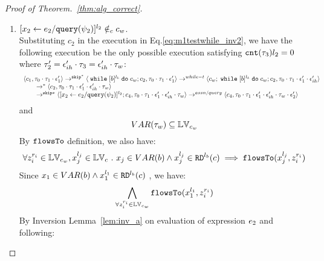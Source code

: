 \begin{proof}[Proof of Theorem.~\ref{thm:alg_correct}]
\begin{case}
\begin{subcase}
\begin{subsubcase}
\begin{subsubsubcase}
\begin{subproof}
\begin{enumerate}
  \\
  By uniqueness of the program label, there must exist another while command in $c_2$, -- i.e., $\ewhile [b_2]^{l_{b2}} \edo c_{w2} \in_c c_2$ --
    such that 
  $\ewhile [b]^{l_b} \edo c_w \in c_{w2}$ and $[\assign{{x}_2}{\expr_2 / \query(\qexpr_2)}]^{l_2} \in_c c_w$, i.e.,:
  \[
  \exists b_2, l_{b2} \in \mathbb{N}, c_{w2} \st 
  \ewhile [b_2]^{l_{b2}} \edo c_{w2} \in_c c_2 
  \land \ewhile [b]^{l_b} \edo c_w \in c_{w2}
  \land [\assign{{x}_2}{\expr_2 / \query(\qexpr_2)}]^{l_2} \in_c c_w
  \]
%
Then we know there exists $c_5$ and $c_6$ such that:
\[
  c_2 =_c c_5; \ewhile [b_2]^{l_{b2}} \edo c_{w2};c_6
\]
Which is contradict to $c_2 =_c [\eskip^*];[\assign{{x}_2}{\expr_2 / \query(\qexpr_2)}]^{l_2};{c}_4$ by program equality definition.
%
%
 \item $[\mathrel{ {x}_2 \leftarrow e_2 / {\tt query}(\psi_2) }]^{l_2} \notin_c c_w$.
%
\\
%
Substituting $c_2$ in the execution in Eq.\ref{eq:m1testwhile_inv2}, we have the following execution be the only possible execution satisfying $\mathtt{cnt}(\mathtt{\tau}_3) l_2 = 0$ where $\mathtt{\tau}_2' = \mathtt{\epsilon}_{ih}' \cdot \mathtt{\tau}_3 = \mathtt{\epsilon}_{ih}' \cdot \mathtt{\tau}_w$:
\[
    \begin{array}{l}   
  \langle c_1, \mathtt{\tau}_0 \cdot \mathtt{\tau}_1 \cdot \mathtt{\epsilon}_1' \rangle 
  \rightarrow^{\mathtt{skip}^*} 
  \langle \;\mathtt{while}\; [b]^{l_b} \;\mathtt{do}\; c_w;{c}_2, \mathtt{\tau}_0 \cdot \mathtt{\tau}_1 \cdot \mathtt{\epsilon}_1' \rangle 
  \rightarrow^{while-t} 
  \langle c_w;\;\mathtt{while}\; [b]^{l_b} \;\mathtt{do}\; c_w;c_2, \mathtt{\tau}_0 \cdot \mathtt{\tau}_1 \cdot \mathtt{\epsilon}_1' \cdot \mathtt{\epsilon}_{ih}' \rangle 
  \\
  \qquad \rightarrow^{*} 
  \langle c_2,\mathtt{\tau}_0 \cdot \mathtt{\tau}_1 \cdot \mathtt{\epsilon}_1' \cdot \mathtt{\epsilon}_{ih}' \cdot \mathtt{\tau}_w \rangle
  \\
  \qquad \rightarrow^{\mathtt{skip}*} 
  \langle [\mathrel{ {x}_2 \leftarrow e_2 / {\tt query}(\psi_2) }]^{l_2};{c}_4, 
  \mathtt{\tau}_0 \cdot \mathtt{\tau}_1 \cdot \mathtt{\epsilon}_1' \cdot \mathtt{\epsilon}_{ih}' \cdot \mathtt{\tau}_w \rangle
  \rightarrow^{assn/query} 
  \langle {c}_4,  \mathtt{\tau}_0 \cdot \mathtt{\tau}_1 \cdot \mathtt{\epsilon}_1' \cdot \mathtt{\epsilon}_{ih}' \cdot \mathtt{\tau}_w \cdot \mathtt{\epsilon}_2' \rangle 
\end{array}
\]
and
\[
  VAR{(\mathtt{\tau}_w)} \subseteq \mathbb{LV}_{c_w}
\]
%
By $\mathtt{flowsTo}$ definition, we also have:
\[
  \forall z_i^{r_i} \in \mathbb{LV}_{c_w},  x_j^{l_j} \in \mathbb{LV}_c ~.~ x_j \in VAR(b) \land x_j^{l_j} \in \mathtt{RD}^{l_b}(c) \implies
  \mathtt{flowsTo}(x_j^{l_j}, z_i^{r_i})
\]
Since $x_1 \in VAR(b) \land x_1^{l_1} \in \mathtt{RD}^{l_b}(c)$ , we have:
\[
  \bigwedge_{\forall z_i^{r_i} \in \mathbb{LV}_{c_w}}
  \mathtt{flowsTo}(x_1^{l_1}, z_i^{r_i})
\]
%
By Inversion Lemma~\ref{lem:inv_a} on evaluation of expression $e_2$ and following: 

\end{enumerate}
\end{subproof}
\end{subsubsubcase}
\end{subsubcase}
\end{subcase}
\end{case}
\end{proof}
